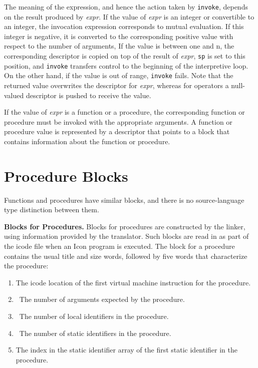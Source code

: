 The meaning of the expression, and hence the action taken by
\texttt{invoke}, depends on the result produced by
\textit{expr}. If the value of
\textit{expr} is an integer or convertible to an
integer, the invocation expression corresponds to mutual
evaluation. If this integer is negative, it is converted to the
corresponding positive value with respect to the number of arguments,
If the value is between one and n, the corresponding descriptor is
copied on top of the result of \textit{expr},
\texttt{sp} is set to this position, and \texttt{invoke} transfers
control to the beginning of the interpretive loop. On the other hand,
if the value is out of range, \texttt{invoke} fails. Note that the
returned value overwrites the descriptor for
\textit{expr}, whereas for operators a null-valued
descriptor is pushed to receive the value.

If the value of \textit{expr} is a function or a
procedure, the corresponding function or procedure must be invoked
with the appropriate arguments. A function or procedure value is
represented by a descriptor that points to a block that contains
information about the function or procedure.

\section{Procedure Blocks}

Functions and procedures have similar blocks, and there is no
source-language type distinction between them.

\textbf{Blocks for Procedures. }Blocks for procedures are constructed
by the linker, using information provided by the translator. Such
blocks are read in as part of the icode file when an Icon program is
executed. The block for a procedure contains the usual title and size
words, followed by five words that characterize the procedure:

\liststyleLxi
\begin{enumerate}
\item 
The icode location of the first virtual machine instruction for the procedure.
\item 
\ The number of arguments expected by the procedure.
\item 
\ The number of local identifiers in the procedure.
\item 
\ The number of static identifiers in the procedure.
\item 
The index in the static identifier array of the first
static identifier in the procedure.
\end{enumerate}


